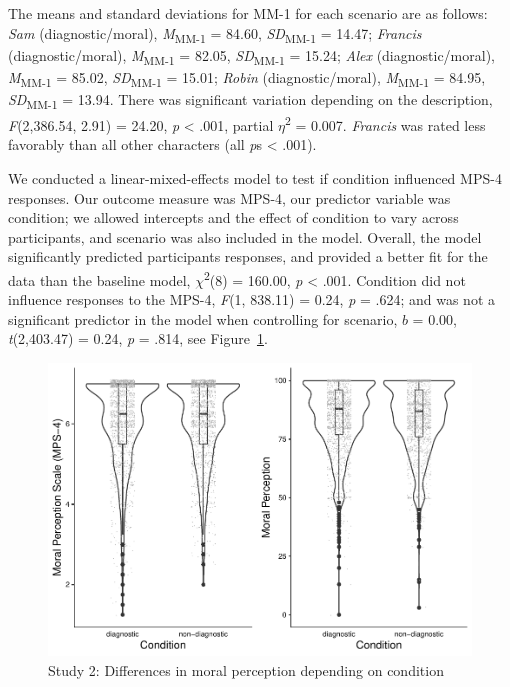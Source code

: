\documentclass[
  american,
  man,floatsintext]{apa7}
\begin{document}
The means and standard deviations for MM-1 for each scenario are as follows:
\emph{Sam} (diagnostic/moral),
\emph{M}\textsubscript{MM-1} = 84.60, \emph{SD}\textsubscript{MM-1} = 14.47;
\emph{Francis} (diagnostic/moral),
\emph{M}\textsubscript{MM-1} = 82.05, \emph{SD}\textsubscript{MM-1} = 15.24;
\emph{Alex} (diagnostic/moral),
\emph{M}\textsubscript{MM-1} = 85.02, \emph{SD}\textsubscript{MM-1} = 15.01;
\emph{Robin} (diagnostic/moral),
\emph{M}\textsubscript{MM-1} = 84.95, \emph{SD}\textsubscript{MM-1} = 13.94. There was significant variation depending on the description, \emph{F}(2,386.54, 2.91) = 24.20, \emph{p} \textless{} .001, partial \(\eta\)\textsuperscript{2} = 0.007. \emph{Francis} was rated less favorably than all other characters (all \emph{p}s \textless{} .001).

We conducted a linear-mixed-effects model to test if condition influenced MPS-4 responses. Our outcome measure was MPS-4, our predictor variable was condition; we allowed intercepts and the effect of condition to vary across participants, and scenario was also included in the model.
Overall, the model significantly predicted participants responses, and provided a better fit for the data than the baseline model, \(\chi\)\textsuperscript{2}(8) = 160.00, \emph{p} \textless{} .001. Condition did not influence responses to the MPS-4, \emph{F}(1, 838.11) = 0.24, \emph{p} = .624; and was not a significant predictor in the model when controlling for scenario, \(b\) = 0.00, \emph{t}(2,403.47) = 0.24, \emph{p} = .814, see Figure~\ref{fig:S2bothconditionplot}.

\begin{figure}
\centering
\includegraphics{moral_dilution_in_chunks_files/figure-latex/S2bothconditionplot-1.pdf}
\caption{\label{fig:S2bothconditionplot}Study 2: Differences in moral perception depending on condition}
\end{figure}
\end{document}
